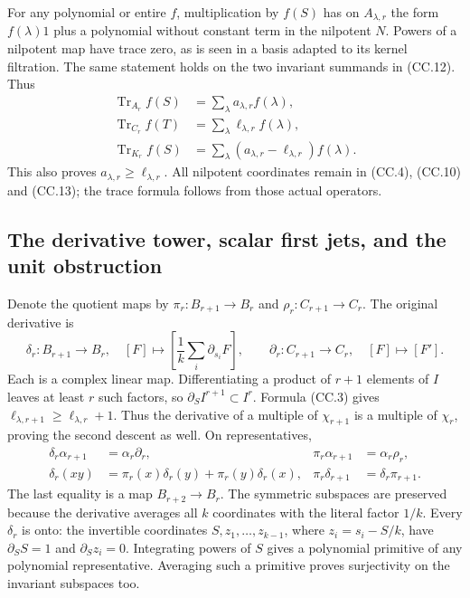 For any polynomial or entire \(f\), multiplication by \(f(S)\) has
on \(A_{\lambda,r}\) the form \(f(\lambda)1\) plus a polynomial
without constant term in the nilpotent \(N\).  Powers of a nilpotent
map have trace zero, as is seen in a basis adapted to its kernel
filtration.  The same statement holds on the two invariant summands
in (CC.12).  Thus
\[
\begin{split}
 \operatorname{Tr}_{A_r}f(S)&=\sum_\lambda a_{\lambda,r}f(\lambda),\\
 \operatorname{Tr}_{C_r}f(T)&=\sum_\lambda\ell_{\lambda,r}f(\lambda),\\
 \operatorname{Tr}_{K_r}f(S)&=
       \sum_\lambda(a_{\lambda,r}-\ell_{\lambda,r})f(\lambda).
\end{split}
\tag{CC.15}
\]
This also proves \(a_{\lambda,r}\geq\ell_{\lambda,r}\).
All nilpotent coordinates remain in (CC.4), (CC.10) and (CC.13);
the trace formula follows from those actual operators.

\subsection{The derivative tower, scalar first jets, and the unit obstruction}

Denote the quotient maps by
\(\pi_r:B_{r+1}\to B_r\) and \(\rho_r:C_{r+1}\to C_r\).
The original derivative is
\[
 \delta_r:B_{r+1}\longrightarrow B_r,\quad
 [F]\longmapsto\left[\frac1k\sum_i\partial_{s_i}F\right],
 \qquad
 \partial_r:C_{r+1}\longrightarrow C_r,\quad [F]\longmapsto[F'].
 \tag{CC.16}
\]
Each is a complex linear map.  Differentiating a product of \(r+1\)
elements of \(I\) leaves at least \(r\) such factors, so
\(\partial_S I^{r+1}\subset I^r\).
Formula (CC.3) gives
\(\ell_{\lambda,r+1}\geq\ell_{\lambda,r}+1\).
Thus the derivative of a multiple of \(\chi_{r+1}\) is a multiple
of \(\chi_r\), proving the second descent as well.  On representatives,
\[
\begin{split}
 \delta_r\alpha_{r+1}&=\alpha_r\partial_r,&
 \pi_r\alpha_{r+1}&=\alpha_r\rho_r,\\
 \delta_r(xy)&=\pi_r(x)\delta_r(y)+\pi_r(y)\delta_r(x),&
 \pi_r\delta_{r+1}&=\delta_r\pi_{r+1}.
\end{split}
\tag{CC.17}
\]
The last equality is a map \(B_{r+2}\to B_r\).
The symmetric subspaces are preserved because the derivative averages
all \(k\) coordinates with the literal factor \(1/k\).
Every \(\delta_r\) is onto: the invertible coordinates
\(S,z_1,\ldots,z_{k-1}\), where \(z_i=s_i-S/k\), have
\(\partial_S S=1\) and \(\partial_Sz_i=0\).  Integrating powers
of \(S\) gives a polynomial primitive of any polynomial representative.
Averaging such a primitive proves surjectivity on the invariant
subspaces too.

